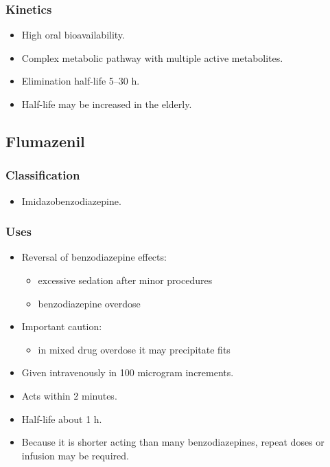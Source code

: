 \documentclass[11pt,a4paper]{article}
\begin{document}
\subsubsection{Kinetics}
\begin{itemize}
  \item High oral bioavailability.
  \item Complex metabolic pathway with multiple active metabolites.
  \item Elimination half-life 5--30 h.
  \item Half-life may be increased in the elderly.
\end{itemize}

\subsection{Flumazenil}

\subsubsection{Classification}
\begin{itemize}
  \item Imidazobenzodiazepine.
\end{itemize}

\subsubsection{Uses}
\begin{itemize}
  \item Reversal of benzodiazepine effects:
  \begin{itemize}
    \item excessive sedation after minor procedures
    \item benzodiazepine overdose
  \end{itemize}
  \item Important caution:
  \begin{itemize}
    \item in mixed drug overdose it may precipitate fits
  \end{itemize}
  \item Given intravenously in 100 microgram increments.
  \item Acts within 2 minutes.
  \item Half-life about 1 h.
  \item Because it is shorter acting than many benzodiazepines, repeat doses or infusion may be required.
\end{itemize}
\end{document}
